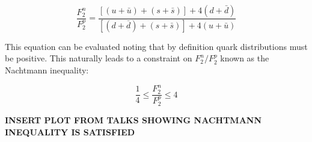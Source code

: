 \begin{equation}
	\frac{F_2^n}{F_2^p} = \frac{\left[\left(u+\bar{u}\right) + \left(s+\bar{s}\right)\right] + 4\left(d+\bar{d}\right)}{\left[\left(d+\bar{d}\right) + \left(s+\bar{s}\right)\right] + 4\left(u+\bar{u}\right)}
\end{equation}

This equation can be evaluated noting that by definition quark distributions must be positive. This naturally leads to a constraint on $F_2^n/F_2^p$ known as the Nachtmann inequality:

\begin{equation}
	\frac{1}{4} \leq \frac{F_2^n}{F_2^p} \leq 4
\end{equation}

\textbf{INSERT PLOT FROM TALKS SHOWING NACHTMANN INEQUALITY IS SATISFIED}

%
%
%
%
%
%
